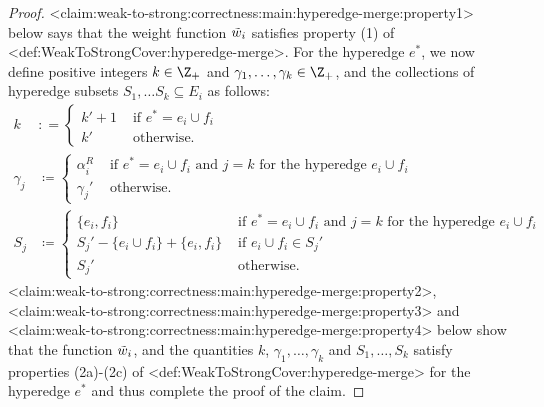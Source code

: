 \documentclass{article}
\def\Cref#1{<#1>}%
\begin{document}
\begin{proof}
    \Cref{claim:weak-to-strong:correctness:main:hyperedge-merge:property1} below says that the weight function $\Tilde{w}_i$ satisfies property (1) of \Cref{def:WeakToStrongCover:hyperedge-merge}. For the hyperedge $e^*$, we now define positive integers $k \in \Z_+$ and $\gamma_1, \ldots, \gamma_{k} \in \Z_+$, and the collections of hyperedge subsets $S_1, \ldots S_{k} \subseteq E_{i}$ as follows:
    \begin{align*}
        k &: =\begin{cases}
            k' + 1& \text{ if } e^* = e_i\cup f_i\\
            k'&\text{ otherwise.}
        \end{cases}&\\
        \gamma_j&\coloneqq  \begin{cases}
            \alpha_i^R& \text{ if } e^* = e_i\cup f_i \text{ and } j = k \text{ for the hyperedge $e_i\cup f_i$}\\
            \gamma_j'&\text{ otherwise}.
        \end{cases}&\\
        S_j& \coloneqq  \begin{cases}
            \{e_i, f_i\}&\text{ if } e^* = e_i\cup f_i \text{ and } j = k \text{ for the hyperedge $e_i\cup f_i$}\\
            S_j' - \{e_i\cup f_i\} + \{e_i, f_i\}&\text{ if } e_i\cup f_i \in S_j'\\
            S_j'& \text{ otherwise.}
        \end{cases}&
    \end{align*}
    \Cref{claim:weak-to-strong:correctness:main:hyperedge-merge:property2}, \Cref{claim:weak-to-strong:correctness:main:hyperedge-merge:property3} and \Cref{claim:weak-to-strong:correctness:main:hyperedge-merge:property4} below show that the function $\Tilde{w}_i$, and the quantities $k$, $\gamma_1, \ldots, \gamma_k$ and $S_1, \ldots, S_k$ satisfy properties (2a)-(2c) of \Cref{def:WeakToStrongCover:hyperedge-merge} for the hyperedge $e^*$ and thus complete the proof of the claim.
\end{proof}
\end{document}
